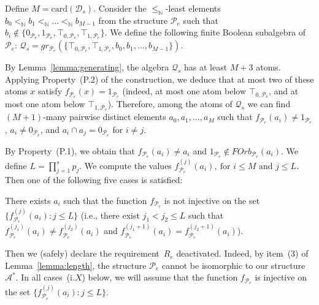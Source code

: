 \documentclass[a4paper,UKenglish,cleveref, autoref, thm-restate]{lipics-v2021}
\begin{document}
Define $M = \mathrm{card}(\mathcal{D}_s)$. Consider the $\leq_{\mathbb{N}}$-least elements $b_0 <_{\mathbb{N}} b_1 <_{\mathbb{N}} \dots <_{\mathbb{N}} b_{M-1}$ from the structure $\mathcal{P}_e$ such that $b_i \not\in \{ 0_{\mathcal{P}_e}, 1_{\mathcal{P}_e}, \top_{0,\mathcal{P}_e}, \top_{1,\mathcal{P}_e}\}$. We define the following finite Boolean subalgebra of $\mathcal{P}_e$:\quad 
$
	\mathcal{Q}_s = gr_{\mathcal{P}_e} (\{ \top_{0,\mathcal{P}_e}, \top_{1,\mathcal{P}_e}, b_0,b_1,\dots,b_{M-1}\}).
$

By Lemma~\ref{lemma:generating}, the algebra $\mathcal{Q}_s$ has at least $M+3$ atoms. Applying Property~(P.2) of the construction, we deduce that at most two of these atoms $x$ satisfy $f_{\mathcal{P}_e}(x) = 1_{\mathcal{P}_e}$ (indeed, at most one atom below $\top_{0,\mathcal{P}_e}$, and at most one atom below $\top_{1,\mathcal{P}_e}$). Therefore, among the atoms of $\mathcal{Q}_s$ we can find $(M+1)$-many pairwise distinct elements $a_0,a_1,\dots,a_{M}$ such that $f_{\mathcal{P}_e}(a_i) \neq 1_{\mathcal{P}_e}$, $a_i\neq 0_{\mathcal{P}_e}$, and $a_i\cap a_j = 0_{\mathcal{P}_e}$ for $i\neq j$.

By Property~(P.1), we obtain that $f_{\mathcal{P}_e}(a_i) \neq a_i$ and $1_{\mathcal{P}_e} \not\in FOrb_{\mathcal{P}_e}(a_i)$. 
We define 
$
	L = \prod_{j=1}^{s} p_j. 
$
We compute the values
$
	f_{\mathcal{P}_e}^{(j)}(a_i),\ \text{for } i \leq M \text{ and } j\leq L.
$
Then one of the following five cases is satisfied:

 There exists $a_i$ such that the function $f_{\mathcal{P}_e}$ is not injective on the set $\{ f_{\mathcal{P}_e}^{(j)}(a_i) : j\leq L\}$ (i.e., there exist $j_1 < j_2 \leq L$ such that $f_{\mathcal{P}_e}^{(j_1)}(a_i) \neq f_{\mathcal{P}_e}^{(j_2)}(a_i)$ and $f_{\mathcal{P}_e}^{(j_1+1)}(a_i) = f_{\mathcal{P}_e}^{(j_2+1)}(a_i)$).

Then we (safely) declare the requirement~$R_e$ deactivated. Indeed, by item~(3) of Lemma~\ref{lemma:length}, the structure $\mathcal{P}_e$ cannot be isomorphic to our structure $\mathcal{A}^{\ast}$. 
In all cases~(i.$X$) below, we will assume that the function $f_{\mathcal{P}_e}$ is injective on the set $\{ f_{\mathcal{P}_e}^{(j)}(a_i) : j\leq L\}$.
\end{document}
